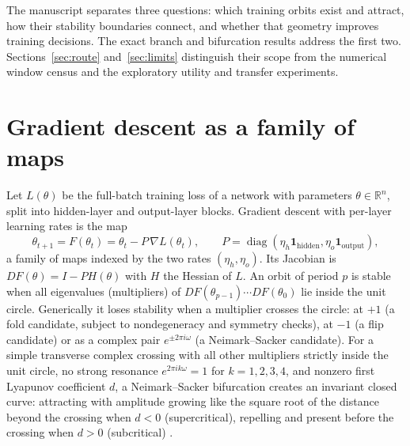 \documentclass[11pt,letterpaper]{article}
\begin{document}
The manuscript separates three questions: which training orbits exist and attract, how their stability
boundaries connect, and whether that geometry improves training decisions. The exact branch and bifurcation
results address the first two. Sections~\ref{sec:route} and~\ref{sec:limits} distinguish their scope from the
numerical window census and the exploratory utility and transfer experiments.

\section{Gradient descent as a family of maps}
\label{sec:background}

Let $L(\theta)$ be the full-batch training loss of a network with parameters $\theta\in\mathbb{R}^n$, split
into hidden-layer and output-layer blocks. Gradient descent with per-layer learning rates is the map
\begin{equation}
\theta_{t+1} = F(\theta_t) = \theta_t - P\,\nabla L(\theta_t), \qquad
P = \operatorname{diag}(\eta_h \mathbf{1}_{\text{hidden}}, \eta_o \mathbf{1}_{\text{output}}),
\label{eq:map}
\end{equation}
a family of maps indexed by the two rates $(\eta_h,\eta_o)$. Its Jacobian is $DF(\theta) = I - P H(\theta)$
with $H$ the Hessian of $L$. An orbit of period $p$ is stable when all eigenvalues (multipliers) of
$DF(\theta_{p-1})\cdots DF(\theta_0)$ lie inside the unit circle. Generically it loses stability when a
multiplier crosses the circle: at $+1$ (a fold candidate, subject to nondegeneracy and symmetry checks),
at $-1$ (a flip candidate) or as a complex pair $e^{\pm 2\pi i\omega}$ (a Neimark--Sacker candidate).
For a simple transverse complex crossing with all other multipliers strictly inside the unit circle,
no strong resonance $e^{2\pi i k\omega}=1$ for $k=1,2,3,4$, and nonzero first Lyapunov coefficient $d$, a
Neimark--Sacker bifurcation creates an invariant closed curve: attracting with amplitude growing like the square
root of the distance beyond the crossing when $d<0$ (supercritical), repelling and present before the crossing
when $d>0$ (subcritical) \citep{kuznetsovsacker2008}.
\end{document}
